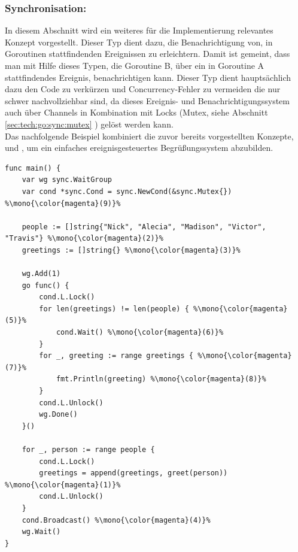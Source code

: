 \subsubsection{Synchronisation: }
In diesem Abschnitt wird ein weiteres für die Implementierung relevantes Konzept vorgestellt. Dieser Typ dient dazu, die Benachrichtigung von, in Goroutinen stattfindenden Ereignissen zu erleichtern. Damit ist gemeint, dass man mit Hilfe dieses Typen, die Goroutine B, über ein in Goroutine A stattfindendes Ereignis, benachrichtigen kann. Dieser Typ dient hauptsächlich dazu den Code zu verkürzen und Concurrency-Fehler zu vermeiden die nur schwer nachvollziehbar sind, da dieses Ereignis- und Benachrichtigungssystem auch über Channels in Kombination mit Locks 
(Mutex, siehe Abschnitt \ref{sec:tech:go:sync:mutex} ) gelöst werden kann.\\
Das nachfolgende Beispiel kombiniert die zuvor bereits vorgestellten Konzepte,  und , um ein einfaches ereignisgesteuertes Begrüßungssystem abzubilden.
\begin{lstlisting}[style=goMono,caption={Kombination aus Concurrency Konzepten: Begrüßungssystem},label={lst:go:sync:concurrency:ex5}]
func main() {
    var wg sync.WaitGroup
    var cond *sync.Cond = sync.NewCond(&sync.Mutex{}) %\mono{\color{magenta}(9)}%
    
    people := []string{"Nick", "Alecia", "Madison", "Victor", "Travis"} %\mono{\color{magenta}(2)}%
    greetings := []string{} %\mono{\color{magenta}(3)}%
    
    wg.Add(1)
    go func() {
        cond.L.Lock()
        for len(greetings) != len(people) { %\mono{\color{magenta}(5)}%
            cond.Wait() %\mono{\color{magenta}(6)}%
        }
        for _, greeting := range greetings { %\mono{\color{magenta}(7)}%
            fmt.Println(greeting) %\mono{\color{magenta}(8)}%
        }
        cond.L.Unlock()
        wg.Done()
    }()
    
    for _, person := range people {
        cond.L.Lock()
        greetings = append(greetings, greet(person)) %\mono{\color{magenta}(1)}%
        cond.L.Unlock()
    }
    cond.Broadcast() %\mono{\color{magenta}(4)}%
    wg.Wait()
}
\end{lstlisting}
